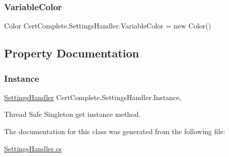\subsubsection{\texorpdfstring{Variable\+Color}{VariableColor}}
{\footnotesize\ttfamily Color Cert\+Complete.\+Settings\+Handler.\+Variable\+Color = new Color()\hspace{0.3cm}{\ttfamily [static]}}



\subsection{Property Documentation}
\mbox{\label{class_cert_complete_1_1_settings_handler_a7c4f8eb33b1113986d52942f93e52da8}} 
\subsubsection{\texorpdfstring{Instance}{Instance}}
{\footnotesize\ttfamily \mbox{\hyperlink{class_cert_complete_1_1_settings_handler}{Settings\+Handler}} Cert\+Complete.\+Settings\+Handler.\+Instance\hspace{0.3cm}{\ttfamily [static]}, {\ttfamily [get]}}



Thread Safe Singleton get instance method. 



The documentation for this class was generated from the following file\+:\begin{DoxyCompactItemize}
\item 
\mbox{\hyperlink{_settings_handler_8cs}{Settings\+Handler.\+cs}}\end{DoxyCompactItemize}
